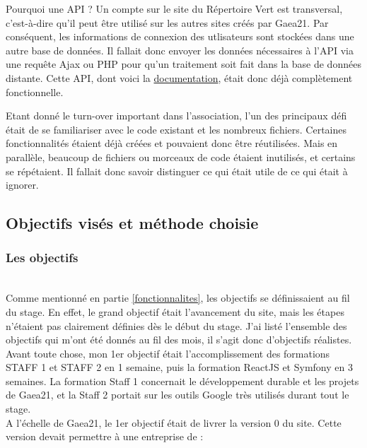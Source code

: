 \begin{callout}{Pourquoi une API ?}
Un compte sur le site du Répertoire Vert est transversal, c'est-à-dire qu'il peut être utilisé sur les autres sites créés par Gaea21. 
Par conséquent, les informations de connexion des utlisateurs sont stockées dans une autre base de données. 
Il fallait donc envoyer les données nécessaires à l'API via une requête Ajax ou PHP pour qu'un traitement soit fait dans la base de données distante. 
Cette API, dont voici la \href{https://gaea21user.sustlivprogram.org/swagger/#/}{documentation}, était donc déjà complètement fonctionnelle.
\end{callout}

Etant donné le turn-over important dans l'association, l'un des principaux défi était de se familiariser avec le code existant et les nombreux fichiers. 
Certaines fonctionnalités étaient déjà créées et pouvaient donc être réutilisées. Mais en parallèle, beaucoup de fichiers ou morceaux de code étaient inutilisés, et certains se répétaient. 
Il fallait donc savoir distinguer ce qui était utile de ce qui était à ignorer.

\pagebreak
\subsection{Objectifs visés et méthode choisie}

\subsubsection{Les objectifs}
~\\
Comme mentionné en partie \ref{fonctionnalites}, les objectifs se définissaient au fil du stage. En effet, le grand objectif était l'avancement du site, mais les étapes n'étaient pas clairement définies dès le début du stage. 
J'ai listé l'ensemble des objectifs qui m'ont été donnés au fil des mois, il s'agit donc d'objectifs réalistes.\\

Avant toute chose, mon 1er objectif était l'accomplissement des formations STAFF 1 et STAFF 2 en 1 semaine, puis la formation ReactJS et Symfony en 3 semaines.
La formation Staff 1 concernait le développement durable et les projets de Gaea21, et la Staff 2 portait sur les outils Google très utilisés durant tout le stage.\\

A l'échelle de Gaea21, le 1er objectif était de livrer la version 0 du site. 
Cette version devait permettre à une entreprise de : 

